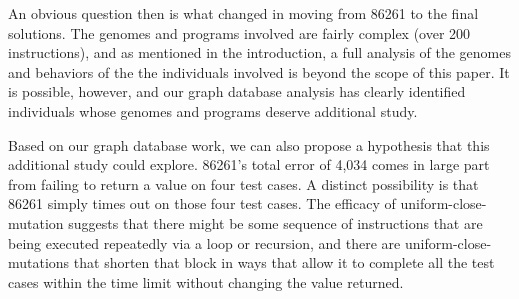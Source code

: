 An obvious question then is what changed in moving from 86261 to the final solutions. The genomes and
programs involved are fairly complex (over 200 instructions), and as mentioned in
the introduction, a full analysis of the genomes and behaviors of the the individuals involved is 
beyond the scope of this paper. It is possible, however, and our graph database analysis has clearly
identified individuals whose genomes and programs deserve additional study. 

Based on our graph database work, we can also propose a hypothesis that this additional study could
explore. 86261's total error of 4,034 comes in large part from failing to return a value on four 
test cases. A distinct possibility is that 86261 simply times out on those
four test cases. The efficacy of uniform-close-mutation suggests that there might be some sequence of 
instructions that are being executed repeatedly via a loop or recursion, and there are 
uniform-close-mutations that shorten that block in ways that allow it to complete all the test
cases within the time limit without changing the value returned.



